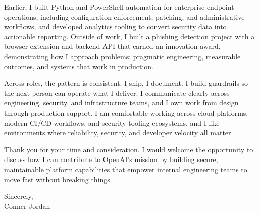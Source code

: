 \documentclass[letterpaper,11pt]{article}
\begin{document}
\vspace{16pt}

Earlier, I built Python and PowerShell automation for enterprise endpoint operations, including configuration enforcement, patching, and administrative workflows, and developed analytics tooling to convert security data into actionable reporting. Outside of work, I built a phishing detection project with a browser extension and backend API that earned an innovation award, demonstrating how I approach problems: pragmatic engineering, measurable outcomes, and systems that work in production.

\vspace{16pt}

Across roles, the pattern is consistent. I ship. I document. I build guardrails so the next person can operate what I deliver. I communicate clearly across engineering, security, and infrastructure teams, and I own work from design through production support. I am comfortable working across cloud platforms, modern CI/CD workflows, and security tooling ecosystems, and I like environments where reliability, security, and developer velocity all matter.

\vspace{16pt}

Thank you for your time and consideration. I would welcome the opportunity to discuss how I can contribute to OpenAI’s mission by building secure, maintainable platform capabilities that empower internal engineering teams to move fast without breaking things.

\vspace{16pt}

Sincerely,\\
Conner Jordan
\end{document}

